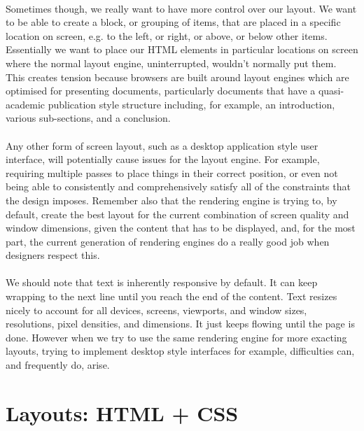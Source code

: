 \paragraph{} Sometimes though, we really want to have more control over our layout. We want to be able to create a block, or grouping of items, that are placed in a specific location on screen, e.g. to the left, or right, or above, or below other items. Essentially we want to place our HTML elements in particular locations on screen where the normal layout engine, uninterrupted, wouldn't normally put them. This creates tension because browsers are built around layout engines which are optimised for presenting documents, particularly documents that have a quasi-academic publication style structure including, for example, an introduction, various sub-sections, and a conclusion.
\paragraph{} Any other form of screen layout, such as a desktop application style user interface, will potentially cause issues for the layout engine. For example, requiring multiple passes to place things in their correct position, or even not being able to consistently and comprehensively satisfy all of the constraints that the design imposes. Remember also that the rendering engine is trying to, by default, create the best layout for the current combination of screen quality and window dimensions, given the content that has to be displayed, and, for the most part, the current generation of rendering engines do a really good job when designers respect this.
\paragraph{} We should note that text is inherently responsive by default. It can keep wrapping to the next line until you reach the end of the content. Text resizes nicely to account for all devices, screens, viewports, and window sizes, resolutions, pixel densities, and dimensions. It just keeps flowing until the page is done. 
However when we try to use the same rendering engine for more exacting layouts, trying to implement desktop style interfaces for example, difficulties can, and frequently do, arise.



\section{Layouts: HTML + CSS}
